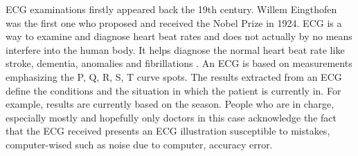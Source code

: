 \documentclass[review]{elsarticle}
\begin{document}

ECG examinations firstly appeared back the 19th century. Willem Eingthofen was the first one who proposed and received the Nobel Prize in 1924. ECG is a way to examine and diagnose heart beat rates and does not actually by no means interfere into the human body. It helps diagnose the normal heart beat rate like stroke, dementia, anomalies and fibrillations \cite{puniaElectrographicClinicalNatural2017, staerkAtrialFibrillation2017}. 
An ECG is based on measurements emphasizing the P, Q, R, S, T curve spots. The results extracted from an ECG define the conditions and the situation in which the patient is currently in. For example, results are currently based on the season. People who are in charge, especially mostly and hopefully only doctors in this case acknowledge the fact that the ECG received presents an ECG illustration susceptible to mistakes, computer-wised such as noise \cite{osmanElectrographicPredictorsElectrographic2018, lippiGlobalEpidemiologyAtrial2021, chuaDynamicChangesCardiovascular2021} due to computer, accuracy error.
\end{document}
